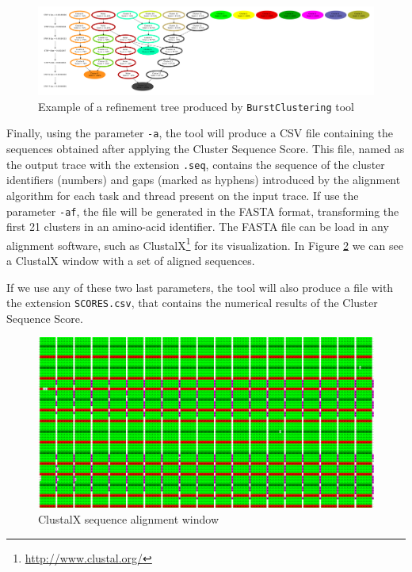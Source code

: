 \documentclass[twoside,a4,english,11pt]{book}
\begin{document}
\begin{figure}
  
  \centering
  \includegraphics[width=1\columnwidth]{refinement_tree/refinement_tree.pdf}
  \caption{Example of a refinement tree produced by \texttt{BurstClustering} tool}
  \label{fig:refinement_tree}

\end{figure}

Finally, using the parameter \texttt{-a}, the tool will produce a CSV file
containing the sequences obtained after applying the Cluster Sequence Score.
This file, named as the output trace with the extension \texttt{.seq}, contains
the sequence of the cluster identifiers (numbers) and gaps (marked as hyphens)
introduced by the alignment algorithm for each task and thread present on
the input trace. If use the parameter \texttt{-af}, the file will be generated
in the FASTA format, transforming the first 21 clusters in an amino-acid 
identifier. The FASTA file can be load in any alignment software, such
as ClustalX\footnote{\url{http://www.clustal.org/}} for its visualization. In
Figure \ref{fig:clustalx_example} we can see a ClustalX window with a set of
aligned sequences.

If we use any of these two last parameters, the tool will also produce a file
with the extension \texttt{SCORES.csv}, that contains the numerical results of
the Cluster Sequence Score. 

\begin{figure}
  \centering
  
  \includegraphics[width=1\columnwidth]{sequences_example/sequences_clustalx.png}
 
  \caption{ClustalX sequence alignment window}
  \label{fig:clustalx_example}
\end{figure}
\end{document}
